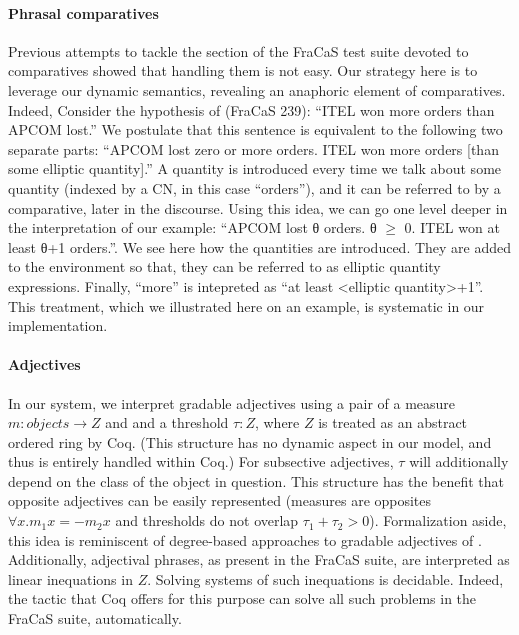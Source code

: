 \documentclass[11pt]{article}
\begin{document}
\paragraph{Phrasal comparatives}
Previous attempts to tackle the section of the FraCaS test suite
devoted to comparatives showed that handling them is not easy. Our
strategy here is to leverage our dynamic semantics, revealing an
anaphoric element of comparatives. Indeed, Consider the hypothesis of
(FraCaS 239): ``ITEL won more orders than APCOM lost.''  We postulate
that this sentence is equivalent to the following two separate parts:
``APCOM lost zero or more orders. ITEL won more orders [than some
elliptic quantity].''  A quantity is introduced every time we talk
about some quantity (indexed by a CN, in this case ``orders''), and it
can be referred to by a comparative, later in the discourse. Using
this idea, we can go one level deeper in the interpretation of our
example: ``APCOM lost θ orders. θ $\ge$ 0.  ITEL won at least θ+1
orders.''. We see here how the quantities are introduced. They are
added to the environment so that, they can be referred to as elliptic
quantity expressions. Finally, ``more'' is intepreted as ``at least
<elliptic quantity>+1''. This treatment, which we illustrated here on
an example, is systematic in our implementation.


\paragraph{Adjectives}
In our system, we interpret gradable adjectives using a pair of a
measure $m : objects → Z$ and and a threshold $τ : Z$, where $Z$ is
treated as an abstract ordered ring by Coq. (This structure has no
dynamic aspect in our model, and thus is entirely handled within Coq.)
For subsective adjectives, $τ$ will additionally depend on the class
of the object in question. This structure has the benefit that
opposite adjectives can be easily represented (measures are opposites
$∀x. m_1 x = -m_2 x$ and thresholds do not overlap $τ_1 + τ_2 >
0$). Formalization aside, this idea is reminiscent of degree-based
approaches to gradable adjectives of
\citet{Cresswell:1976,Kennedy:2007}.  Additionally,
adjectival phrases, as present in the FraCaS suite, are interpreted as
linear inequations in $Z$. Solving systems of such inequations is
decidable. Indeed, the tactic that Coq offers for this purpose can
solve all such problems in the FraCaS suite, automatically.


\end{document}
